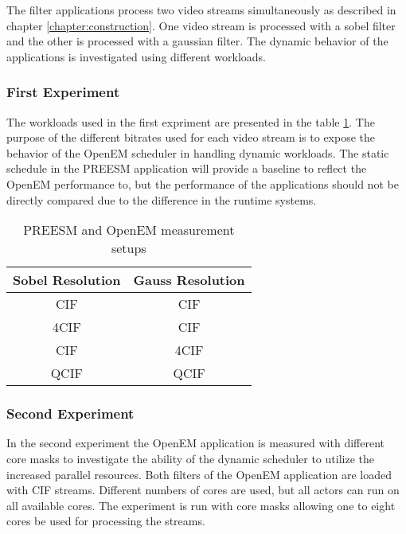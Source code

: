 The filter applications process two video streams simultaneously as described in chapter \ref{chapter:construction}. One video stream is processed with a sobel filter and the other is processed with a gaussian filter. The dynamic behavior of the applications is investigated using different workloads.

\subsubsection{First Experiment}
\label{subsubsec:first-experiment}
The workloads used in the first expriment are presented in the table \ref{tab:preesm_setups}. The purpose of the different bitrates used for each video stream is to expose the behavior of the OpenEM scheduler in handling dynamic workloads. The static schedule in the PREESM application will provide a baseline to reflect the OpenEM performance to, but the performance of the applications should not be directly compared due to the difference in the runtime systems.

\begin{table}
    \begin{center}
        \begin{tabular}{ c c }
            Sobel Resolution & Gauss Resolution \\ \hline
            CIF              & CIF              \\ \hline
            4CIF             & CIF              \\ \hline
            CIF              & 4CIF             \\ \hline
            QCIF             & QCIF             \\ \hline
        \end{tabular}
        \caption{PREESM and OpenEM measurement setups}
        \label{tab:preesm_setups}
    \end{center}
\end{table}

\subsubsection{Second Experiment}
\label{subsubsec:second-experiment}
In the second experiment the OpenEM application is measured with different core masks to investigate the ability of the dynamic scheduler to utilize the increased parallel resources. Both filters of the OpenEM application are loaded with CIF streams. Different numbers of cores are used, but all actors can run on all available cores. The experiment is run with core masks allowing one to eight cores be used for processing the streams.

